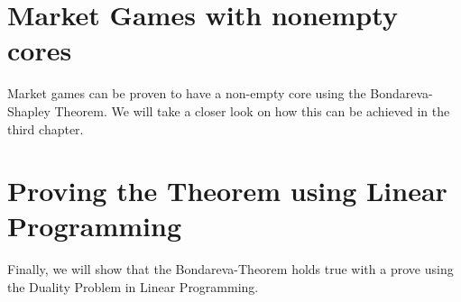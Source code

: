 \documentclass[10pt,a4paper,titlepage]{article}
\theoremstyle{plain}
\theoremstyle{definition}
\begin{document}
 \section{Market Games with nonempty cores}
 Market games can be proven to have a non-empty core using the Bondareva-Shapley Theorem. We will take a closer look on how this can be achieved in the third chapter.

 \section{Proving the Theorem using Linear Programming}
 Finally, we will show that the Bondareva-Theorem holds true with a prove using the Duality Problem in Linear Programming.
 
\pagebreak
 


\end{document}
